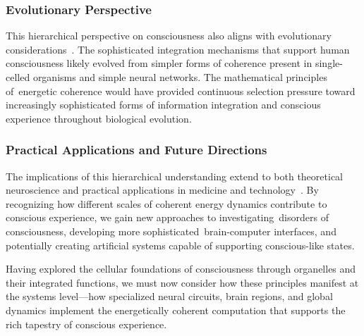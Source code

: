 \subsubsection{Evolutionary Perspective~~}

This hierarchical perspective on consciousness also aligns with evolutionary considerations~\cite{feinberg2016ancient, gershman2023molecular}. The sophisticated integration mechanisms that support human consciousness likely evolved from simpler forms of coherence present in single-celled organisms and simple neural networks. The mathematical principles of~energetic coherence would have provided continuous selection pressure toward increasingly sophisticated forms of information integration and conscious experience throughout biological evolution.

\subsubsection{Practical Applications and Future Directions~~}

The implications of this hierarchical understanding extend to both theoretical neuroscience and practical applications in medicine and technology~\cite{Dehaene2014, seth2024conscious}. By recognizing how different scales of coherent energy dynamics contribute to conscious experience, we gain new approaches to investigating~disorders of consciousness, developing more sophisticated~brain-computer interfaces, and potentially creating artificial systems capable of supporting conscious-like states.

Having explored the cellular foundations of consciousness through organelles and their integrated functions, we must now consider how these principles manifest at the systems level—how specialized neural circuits, brain regions, and global dynamics implement the energetically coherent computation that supports the rich tapestry of conscious experience.